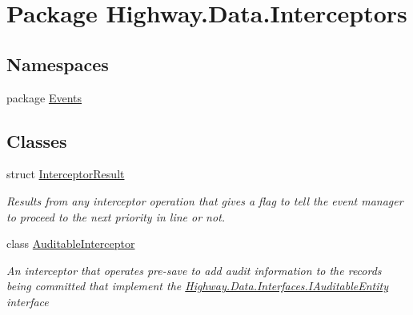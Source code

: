 \hypertarget{namespace_highway_1_1_data_1_1_interceptors}{\section{Package Highway.\-Data.\-Interceptors}
\label{namespace_highway_1_1_data_1_1_interceptors}
}
\subsection*{Namespaces}
\begin{DoxyCompactItemize}
\item 
package \hyperlink{namespace_highway_1_1_data_1_1_interceptors_1_1_events}{Events}
\end{DoxyCompactItemize}
\subsection*{Classes}
\begin{DoxyCompactItemize}
\item 
struct \hyperlink{struct_highway_1_1_data_1_1_interceptors_1_1_interceptor_result}{Interceptor\-Result}
\begin{DoxyCompactList}\small\item\em Results from any interceptor operation that gives a flag to tell the event manager to proceed to the next priority in line or not. \end{DoxyCompactList}\item 
class \hyperlink{class_highway_1_1_data_1_1_interceptors_1_1_auditable_interceptor}{Auditable\-Interceptor}
\begin{DoxyCompactList}\small\item\em An interceptor that operates pre-\/save to add audit information to the records being committed that implement the \hyperlink{interface_highway_1_1_data_1_1_interfaces_1_1_i_auditable_entity}{Highway.\-Data.\-Interfaces.\-I\-Auditable\-Entity} interface \end{DoxyCompactList}\end{DoxyCompactItemize}
